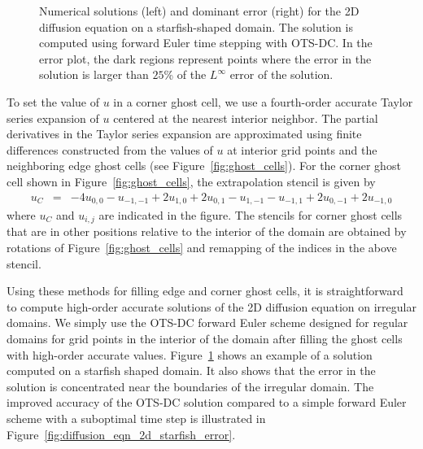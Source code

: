 \documentclass[fleqn,12pt,twoside]{article}
\newcommand{\bea}{\begin{eqnarray}}
\newcommand{\eea}{\end{eqnarray}}
\begin{document}
\begin{figure}[tb]
\begin{center}
\caption{Numerical solutions (left) and dominant error (right) for the 2D 
diffusion equation on a starfish-shaped domain.  The solution is computed 
using forward Euler time stepping with OTS-DC.  In the error plot, the dark 
regions represent points where the error in the solution is larger than 
$25$\% of the $L^\infty$ error of the solution.  
}
\label{fig:diffusion_eqn_2d_starfish_domain}
\end{center}
\end{figure}

To set the value of $u$ in a corner ghost cell, we use a fourth-order accurate
Taylor series expansion of $u$ centered at the nearest interior 
neighbor.  The partial derivatives in the Taylor series expansion are 
approximated using finite differences constructed from the values of $u$ 
at interior grid points and the neighboring edge ghost cells (see 
Figure~\ref{fig:ghost_cells}).  For the corner ghost cell shown 
in Figure~\ref{fig:ghost_cells}, the extrapolation stencil is given by
\bea
  u_C &=&  -4 u_{0,0} - u_{-1,-1} + 2 u_{1,0} + 2 u_{0,1}
      - u_{1,-1} - u_{-1,1} + 2 u_{0,-1} + 2 u_{-1,0}
\eea
where $u_C$ and $u_{i,j}$ are indicated in the figure.  The stencils for
corner ghost cells that are in other positions relative to the interior of 
the domain are obtained by rotations of Figure~\ref{fig:ghost_cells} and 
remapping of the indices in the above stencil.

Using these methods for filling edge and corner ghost cells, it is 
straightforward to compute high-order accurate solutions of the 2D diffusion 
equation on irregular domains.  We simply use the OTS-DC forward Euler 
scheme designed for regular domains for grid points in the interior of the 
domain after filling the ghost cells with high-order accurate values.  
Figure~\ref{fig:diffusion_eqn_2d_starfish_domain} shows an example of 
a solution computed on a starfish shaped domain.  It also shows that the 
error in the solution is concentrated near the boundaries of the irregular
domain.  The improved accuracy of the OTS-DC solution compared to a simple 
forward Euler scheme with a suboptimal time step is illustrated in 
Figure~\ref{fig:diffusion_eqn_2d_starfish_error}. 
\end{document}
